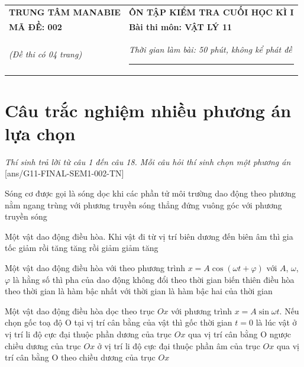 \begin{center}
	\begin{tabular}{M{9.25cm}M{8.75cm}}
		\textbf{TRUNG TÂM MANABIE}& \textbf{ÔN TẬP KIỂM TRA CUỐI HỌC KÌ I}\\
		\textbf{MÃ ĐỀ: 002}& \textbf{Bài thi môn: VẬT LÝ 11}\\
		\textit{(Đề thi có 04 trang)}& \textit{Thời gian làm bài: 50 phút, không kể phát đề}
		
		\noindent\rule{4cm}{0.8pt} \\
	\end{tabular}
\end{center}
\setcounter{section}{0}
\section{Câu trắc nghiệm nhiều phương án lựa chọn}
\textit{Thí sinh trả lời từ câu 1 đến câu 18. Mỗi câu hỏi thí sinh chọn một phương án}
\setcounter{ex}{0}
[ans/G11-FINAL-SEM1-002-TN]
\begin{ex}
	Sóng cơ được gọi là sóng dọc khi các phần tử môi trường dao động theo phương
	\choice
	{nằm ngang}
	{\True trùng với phương truyền sóng}
	{thẳng đứng}
	{vuông góc với phương truyền sóng}
	\loigiai{}
\end{ex}
\begin{ex}
Một vật dao động điều hòa. Khi vật đi từ vị trí biên dương đến biên âm thì gia tốc
	\choice
	{giảm rồi tăng}
	{tăng rồi giảm}
	{giảm}
	{\True tăng}
	\loigiai{}
\end{ex}
\begin{ex}
Một vật dao động điều hòa với theo phương trình $x=A\cos\left(\omega t+\varphi\right)$ với $A$, $\omega$, $\varphi$ là hằng số thì pha của dao động
	\choice
	{không đổi theo thời gian}
	{biến thiên điều hòa theo thời gian}
	{\True là hàm bậc nhất với thời gian}
	{là hàm bậc hai của thời gian}
	\loigiai{}
\end{ex}
\begin{ex}
Một vật dao động điều hòa dọc theo trục $Ox$ với phương trình $x=A\sin \omega t$. Nếu chọn gốc toạ độ O tại vị trí cân bằng của vật thì gốc thời gian $t=0$ là lúc vật
	\choice
	{ở vị trí li độ cực đại thuộc phần dương của trục $Ox$}
	{qua vị trí cân bằng O ngược chiều dương của trục $Ox$}
	{ở vị trí li độ cực đại thuộc phần âm của trục $Ox$}
	{\True qua vị trí cân bằng O theo chiều dương của trục $Ox$}
	\loigiai{}
\end{ex}
